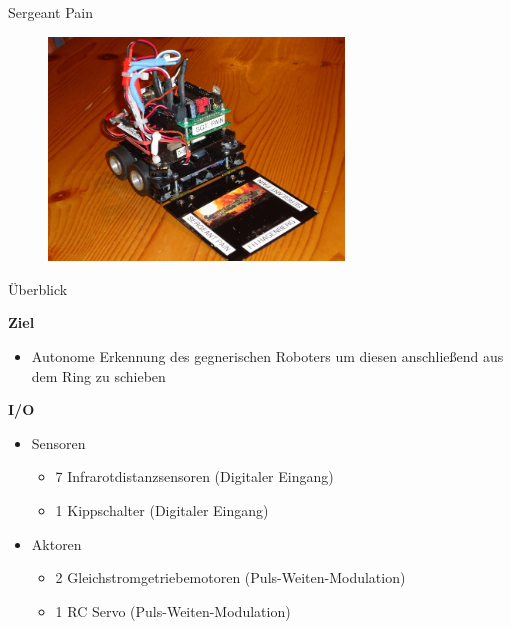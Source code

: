 \documentclass{beamer}
\begin{document}
\begin{frame}{Sergeant Pain}
 \begin{figure}[H]
  \centering
  \includegraphics[width=0.7\textwidth]{./images/robot-sergeant-pain.jpg}
 \end{figure}
\end{frame}
\begin{frame}{\"Uberblick}
\begin{large}\textbf{Ziel}\end{large}
\begin{itemize}
	\item Autonome Erkennung des gegnerischen Roboters um diesen anschlie\ss{}end aus dem Ring zu schieben
\end{itemize}
\vspace{1cm}
\begin{large}\textbf{I/O}\end{large}
\begin{itemize}
	\item Sensoren
	\begin{itemize}
		\item 7 Infrarotdistanzsensoren (Digitaler Eingang)
		\item 1 Kippschalter (Digitaler Eingang)
	\end{itemize}
	\item Aktoren
	\begin{itemize}
		\item 2 Gleichstromgetriebemotoren (Puls-Weiten-Modulation)
		\item 1 RC Servo (Puls-Weiten-Modulation)
	\end{itemize}
\end{itemize}
\end{frame}
\end{document}
